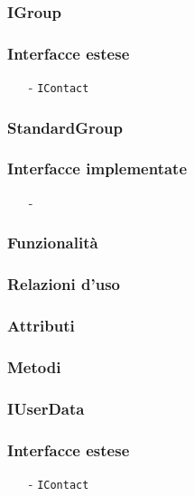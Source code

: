 \subsubsection{IGroup}\label{sec:igroup}
\subsubsection*{Interfacce estese}
\begin{itemize}[noitemsep,nolistsep]
  \item[-] \texttt{IContact}
\end{itemize}

\subsubsection{StandardGroup}\label{sec:standardgroup}

\subsubsection*{Interfacce implementate}
\begin{itemize}[noitemsep,nolistsep]
  \item[-]
\end{itemize}

\subsubsection*{Funzionalità}

\subsubsection*{Relazioni d'uso}

\subsubsection*{Attributi}

\subsubsection*{Metodi}

\subsubsection{IUserData}\label{sec:iuserdata}
\subsubsection*{Interfacce estese}
\begin{itemize}[noitemsep,nolistsep]
  \item[-] \texttt{IContact}
\end{itemize}

